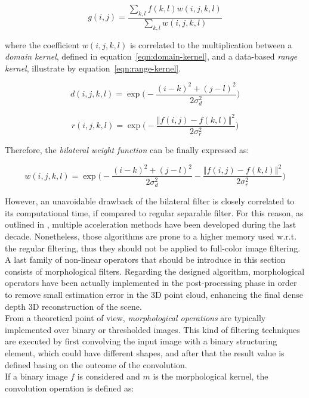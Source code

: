 \begin{equation}
	\label{eqn:bilateral-filter}
	g(i, j) = \frac{\sum_{k,l} f(k,l)w(i,j,k,l)}{\sum_{k,l}w(i,j,k,l)}
\end{equation}

where the coefficient $w(i,j,k,l)$ is correlated to the multiplication between a \textit{domain kernel}, defined in equation~\ref{eqn:domain-kernel}, and a data-based \textit{range kernel}, illustrate by equation~\ref{eqn:range-kernel}.

\begin{equation}
	\label{eqn:domain-kernel}
	d(i,j,k,l) = \exp \Big( - \frac{(i - k)^2 + (j - l)^2}{2 \sigma^2_d} \Big)
\end{equation}

\begin{equation}
	\label{eqn:range-kernel}
	r(i,j,k,l) = \exp \Big( - \frac{\Vert f(i,j) - f(k,l) \Vert^2}{2 \sigma^2_r} \Big)
\end{equation}

Therefore, the \textit{bilateral weight function} can be finally expressed as:

\begin{equation}
	\label{eqn:bilateral-weight-fnct}
	w(i,j,k,l) = \exp \Big( - \frac{(i - k)^2 + (j - l)^2}{2 \sigma^2_d}  - \frac{\Vert f(i,j) - f(k,l) \Vert^2}{2 \sigma^2_r}\Big)
\end{equation}

However, an unavoidable drawback of the bilateral filter is closely correlated to its computational time, if compared to regular separable filter.
For this reason, as outlined in \cite{Szeliski2011}, multiple acceleration methods have been developed during the last decade.
Nonetheless, those algorithms are prone to a higher memory used w.r.t. the regular filtering, thus they should not be applied to full-color image filtering.\\
A last family of non-linear operators that should be introduce in this section consists of morphological filters.
Regarding the designed algorithm, morphological operators have been actually implemented in the post-processing phase in order to remove small estimation error in the 3D point cloud, enhancing the final dense depth 3D reconstruction of the scene.\\
From a theoretical point of view, \textit{morphological operations} are typically implemented over binary or thresholded images. 
This kind of filtering techniques are executed by first convolving the input image with a binary structuring element, which could have different shapes, and after that the result value is defined basing on the outcome of the convolution.\\
If a binary image $f$ is considered and $m$ is the morphological kernel, the convolution operation is defined as:

